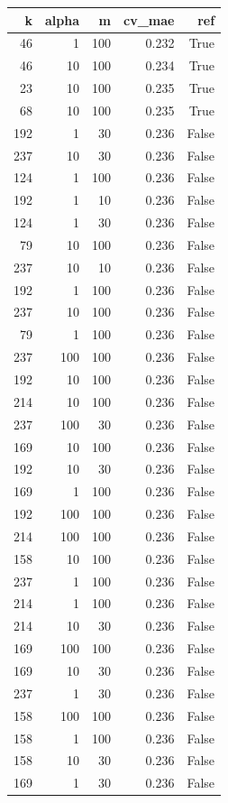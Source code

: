 \begin{tabular}{rrrrr}
\toprule
k & alpha & m & cv_mae & ref \\
\midrule
46 & 1 & 100 & 0.232 & True \\
46 & 10 & 100 & 0.234 & True \\
23 & 10 & 100 & 0.235 & True \\
68 & 10 & 100 & 0.235 & True \\
192 & 1 & 30 & 0.236 & False \\
237 & 10 & 30 & 0.236 & False \\
124 & 1 & 100 & 0.236 & False \\
192 & 1 & 10 & 0.236 & False \\
124 & 1 & 30 & 0.236 & False \\
79 & 10 & 100 & 0.236 & False \\
237 & 10 & 10 & 0.236 & False \\
192 & 1 & 100 & 0.236 & False \\
237 & 10 & 100 & 0.236 & False \\
79 & 1 & 100 & 0.236 & False \\
237 & 100 & 100 & 0.236 & False \\
192 & 10 & 100 & 0.236 & False \\
214 & 10 & 100 & 0.236 & False \\
237 & 100 & 30 & 0.236 & False \\
169 & 10 & 100 & 0.236 & False \\
192 & 10 & 30 & 0.236 & False \\
169 & 1 & 100 & 0.236 & False \\
192 & 100 & 100 & 0.236 & False \\
214 & 100 & 100 & 0.236 & False \\
158 & 10 & 100 & 0.236 & False \\
237 & 1 & 100 & 0.236 & False \\
214 & 1 & 100 & 0.236 & False \\
214 & 10 & 30 & 0.236 & False \\
169 & 100 & 100 & 0.236 & False \\
169 & 10 & 30 & 0.236 & False \\
237 & 1 & 30 & 0.236 & False \\
158 & 100 & 100 & 0.236 & False \\
158 & 1 & 100 & 0.236 & False \\
158 & 10 & 30 & 0.236 & False \\
169 & 1 & 30 & 0.236 & False \\

\end{tabular}

